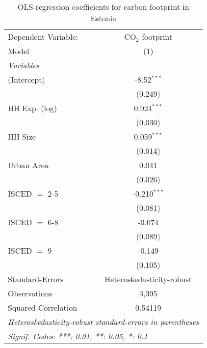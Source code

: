 
\begin{table}[htbp!]
   \centering
   \small
   \begin{adjustbox}{width = 1\textwidth, max height = 0.95\textheight, center}
      \begin{threeparttable}[b]
         \caption{\label{tab:OLS_2_EST} OLS-regression coefficients for carbon footprint in Estonia}
         \begin{tabular}{lc}
            \tabularnewline \midrule \midrule
            Dependent Variable: & CO$_{2}$ footprint\\  
            Model               & (1)\\  
            \midrule
            \emph{Variables}\\
            (Intercept)         & -8.52$^{***}$\\   
                                & (0.249)\\   
            HH Exp. (log)       & 0.924$^{***}$\\   
                                & (0.030)\\   
            HH Size             & 0.059$^{***}$\\   
                                & (0.014)\\   
            Urban Area          & 0.041\\   
                                & (0.026)\\   
            ISCED $=$ 2-5       & -0.210$^{***}$\\   
                                & (0.081)\\   
            ISCED $=$ 6-8       & -0.074\\   
                                & (0.089)\\   
            ISCED $=$ 9         & -0.149\\   
                                & (0.105)\\   
            \midrule 
            Standard-Errors     & Heteroskedasticity-robust \\   
            Observations        & 3,395\\  
            Squared Correlation & 0.54119\\  
            \midrule \midrule
            \multicolumn{2}{l}{\emph{Heteroskedasticity-robust standard-errors in parentheses}}\\
            \multicolumn{2}{l}{\emph{Signif. Codes: ***: 0.01, **: 0.05, *: 0.1}}\\
         \end{tabular}
         

\end{threeparttable}
\end{adjustbox}
\end{table}
